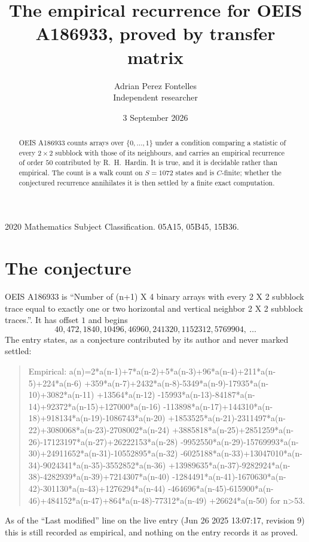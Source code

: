 \documentclass[11pt,a4paper]{article}
\title{The empirical recurrence for OEIS A186933, proved by transfer matrix}
\author{Adrian Perez Fontelles\\ \small Independent researcher}
\date{3 September 2026}
\theoremstyle{plain}
\theoremstyle{definition}
\begin{document}
\maketitle

\begin{abstract}
OEIS A186933 counts arrays over $\{0,\dots,1\}$ under a condition comparing a statistic of
every $2\times2$ subblock with those of its neighbours, and carries an empirical recurrence
of order $50$ contributed by R.~H.~Hardin. It is true, and it is decidable rather than
empirical. The count is a walk count on $S=1072$ states and is $C$-finite; whether the
conjectured recurrence annihilates it is then settled by a finite exact computation.
\end{abstract}

\noindent\small 2020 Mathematics Subject Classification. 05A15, 05B45, 15B36.\normalsize

\section{The conjecture}

OEIS A186933 is ``Number of (n+1) X 4 binary arrays with every 2 X 2 subblock trace equal to exactly one or two horizontal and vertical neighbor 2 X 2 subblock traces.''. It has offset $1$ and begins
\[
40, 472, 1840, 10496, 46960, 241320, 1152312, 5769904,\ \dots
\]
The entry states, as a conjecture contributed by its author and never marked settled:
\begin{quote}
Empirical: a(n)=2*a(n-1)+7*a(n-2)+5*a(n-3)+96*a(n-4)+211*a(n-5)+224*a(n-6) +359*a(n-7)+2432*a(n-8)-5349*a(n-9)-17935*a(n-10)+3082*a(n-11) +13564*a(n-12) -15993*a(n-13)-84187*a(n-14)+92372*a(n-15)+127000*a(n-16) -113898*a(n-17)+144310*a(n-18)+918134*a(n-19)-1086743*a(n-20) +1853525*a(n-21)-2311497*a(n-22)+3080068*a(n-23)-2708002*a(n-24) +3885818*a(n-25)+2851259*a(n-26)-17123197*a(n-27)+26222153*a(n-28) -9952550*a(n-29)-15769993*a(n-30)+24911652*a(n-31)-10552895*a(n-32) -6025188*a(n-33)+13047010*a(n-34)-9024341*a(n-35)-3552852*a(n-36) +13989635*a(n-37)-9282924*a(n-38)-4282939*a(n-39)+7214307*a(n-40) -1284491*a(n-41)-1670630*a(n-42)-301130*a(n-43)+1276294*a(n-44) -464696*a(n-45)-615900*a(n-46)+484152*a(n-47)+864*a(n-48)-77312*a(n-49) +26624*a(n-50) for n>53.
\end{quote}
As of the ``Last modified'' line on the live entry (Jun 26 2025 13:07:17, revision 9) this is still
recorded as empirical, and nothing on the entry records it as proved.
\end{document}
